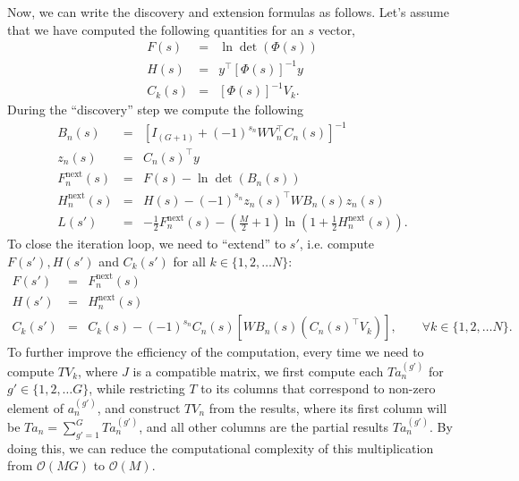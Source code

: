 \documentclass[letter,10pt,oneside]{article}
\newcommand{\ba}{\begin{eqnarray*}}
\newcommand{\ea}{\end{eqnarray*}}
\newcommand{\+}{^\dagger}
\newcommand{\T}{^\top}
\begin{document}
Now, we can write the discovery and extension formulas as follows. Let's assume that we have computed the following quantities for an $s$ vector,
\ba
  F(s) &=& \ln\det(\Phi(s)) \\
  H(s) &=& y\T[\Phi(s)]^{-1}y \\
  C_k(s) &=& [\Phi(s)]^{-1} V_k.
\ea
During the ``discovery'' step we compute the following
\ba
  B_n(s) &=& \left[I_{(G+1)} + (-1)^{s_n} WV_n\T C_n(s)\right]^{-1} \\
  z_n(s) &=& C_n(s)\T y \\
  F^\text{next}_n(s) &=& F(s) - \ln\det(B_n(s)) \\
  H^\text{next}_n(s) &=& H(s) - (-1)^{s_n} z_n(s)\T WB_n(s) z_n(s) \\
  L(s') &=& -\frac{1}{2}F^\text{next}_n(s) -\left(\frac{M}{2} + 1\right) \ln\left(1 + \frac{1}{2}H^\text{next}_n(s)\right).
\ea
To close the iteration loop, we need to ``extend'' to $s'$, i.e. compute $F(s'), H(s')$ and $C_k(s')$ for all $k \in \{1,2,\ldots N\}$:
\ba
  F(s') &=& F^\text{next}_n(s) \\
  H(s') &=& H^\text{next}_n(s) \\
  C_k(s') &=& C_k(s) - (-1)^{s_n} C_n(s) \left[WB_n(s) \left(C_n(s)\T V_k\right)\right],\qquad \forall k \in \{1,2,\ldots N\}.
\ea
To further improve the efficiency of the computation, every time we need to compute $T V_k$, where $J$ is a compatible matrix, we first compute each $Ta_n^{(g')}$ for $g'\in\{1,2,\ldots G\}$, while restricting $T$ to its columns that correspond to non-zero element of $a_n^{(g')}$, and construct $TV_n$ from the results, where its first column will be $T a_n = \sum_{g'=1}^G Ta_n^{(g')}$, and all other columns are the partial results $Ta_n^{(g')}$. By doing this, we can reduce the computational complexity of this multiplication from $\mathcal{O}(M G)$ to $\mathcal{O}(M)$.
\end{document}
